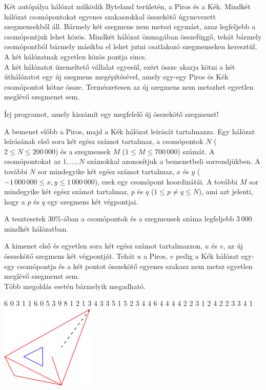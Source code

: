 ﻿





Két autópálya hálózat működik Byteland területén, a Piros és a Kék. Mindkét hálózat csomópontokat egyenes szakaszokkal összekötő úgynevezett szegmensekből áll. Bármely két szegmens nem metszi egymást, azaz legfeljebb a csomópontjuk lehet közös. Mindkét hálózat önmagában összefüggő, tehát bármely csomópontból bármely másikba el lehet jutni csatlakozó szegmenseken keresztül.
A két hálózatnak egyetlen közös pontja sincs.\\
A két hálózatot üzemeltető vállalat egyesül, ezért össze akarja kötni a két úthálózatot egy új szegmens megépítésével, amely egy-egy Piros és Kék csomópontot kötne össze. Természetesen az új szegmens nem metszhet egyetlen meglévő szegmenst sem.

Írj programot, amely kiszámít egy megfelelő új összekötő szegmenst!

A bemenet előbb a Piros, majd a Kék hálózat leírását tartalmazza. Egy hálózat leírásának első sora két egész számot tartalmaz, a csomópontok $N$ ($2 \leq N \leq 200\,000$) és a szegmensek $M$ ($1 \leq M \leq 700\,000$) számát. A csomópontokat az $1,\ldots,N$  számokkal azonosítjuk a bemenetbeli sorrendjükben. A további $N$ sor mindegyike két egész számot tartalmaz, $x$ és $y$ ($-1\,000\,000 \leq x,y \leq 1\,000\,000$), ezek egy csomópont koordinátái. A további $M$ sor mindegyike két egész számot tartalmaz, $p$ és $q$ ($1\leq p \neq q \leq N$), ami azt jelenti, hogy a $p$ és $q$ egy szegmens két végpontjai.

\smallskip
 A tesztesetek $30\%$-ában a csomópontok és a szegmensek száma legfeljebb $3\, 000$ mindkét hálózatban.

A kimenet első és egyetlen sora két egész számot tartalmazzon, $u$ és $v$, az új összekötő szegmens két végpontját. Tehát $u$ a Piros, $v$ pedig a Kék hálózat egy-egy csomópontja és a két pontot összekötő egyenes szakasz nem metsz egyetlen meglévő szegmenst sem.\\
Több megoldás esetén bármelyik megadható.


 6
0 3
1 1
6 0
5 3
9 8
1 2
1 3
4 3
3 5
1 5
2 3
4 4
6 4
4 4
4 2
2 3
1 2
4 2
2 3
3 4
 1
\sampleCOMMENT
\includegraphics[height=4cm]{img/fig11.pdf}
\sampleEND


